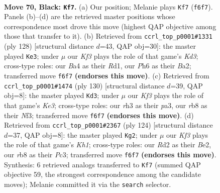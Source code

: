 \documentclass[11pt]{article}
\begin{document}
\clearpage

\begin{figure}[p]\centering
\begin{subfigure}{0.46\textwidth}\centering
\resizebox{\linewidth}{!}{%
\newchessgame
\chessboard[
  setfen={1R4n1/p7/P4k1p/1P3p2/b4P2/7R/3r4/4b1K1 b - - 10 70},
  showmover=false,
  pgfstyle=straightmove, color=movearrow, markmove={f6-f7}
]}
\caption{}
\end{subfigure}\hfill
\begin{subfigure}{0.46\textwidth}\centering
\resizebox{\linewidth}{!}{%
\newchessgame
\chessboard[
  setfen={4k3/7p/2r2BpP/6P1/1r6/3K4/B2p4/3R4 w - - 7 65},
  showmover=false,
  pgfstyle=straightmove, color=movearrow, markmove={d3-e3}
]}
\caption{}
\end{subfigure}
\\[4pt]
\begin{subfigure}{0.46\textwidth}\centering
\resizebox{\linewidth}{!}{%
\newchessgame
\chessboard[
  setfen={4k3/6p1/6r1/1p2P1Bp/1P6/p3KN2/P7/8 w - - 3 66},
  showmover=false,
  pgfstyle=straightmove, color=movearrow, markmove={e3-d3}
]}
\caption{}
\end{subfigure}\hfill
\begin{subfigure}{0.46\textwidth}\centering
\resizebox{\linewidth}{!}{%
\newchessgame
\chessboard[
  setfen={8/8/8/2rNp1k1/P3P3/2P3p1/4B2p/7K w - - 17 63},
  showmover=false,
  pgfstyle=straightmove, color=movearrow, markmove={h1-g2}
]}
\caption{}
\end{subfigure}
\caption{\textbf{Move 70, Black: \texttt{Kf7}.} (a) Our position; Melanie plays \texttt{Kf7} (\texttt{f6f7}). Panels (b)--(d) are the retrieved master positions whose correspondence most drove this move (highest QAP objective among those that transfer to it). (b) Retrieved from \texttt{ccrl\_top\_p0001\#1331} (ply 128) [structural distance $d$=43, QAP obj=30]: the master played \texttt{Ke3}; under $\mu$ our \emph{Kf3} plays the role of that game's \emph{Kd3}; cross-type roles: our \emph{B}a4 as their \emph{R}d1, our \emph{P}h6 as their \emph{B}a2; transferred move \texttt{f6f7} \textbf{(endorses this move)}. (c) Retrieved from \texttt{ccrl\_top\_p0001\#1474} (ply 130) [structural distance $d$=39, QAP obj=8]: the master played \texttt{Kd3}; under $\mu$ our \emph{Kf3} plays the role of that game's \emph{Ke3}; cross-type roles: our \emph{r}h3 as their \emph{p}a3, our \emph{r}b8 as their \emph{N}f3; transferred move \texttt{f6f7} \textbf{(endorses this move)}. (d) Retrieved from \texttt{ccrl\_top\_p0001\#2367} (ply 124) [structural distance $d$=37, QAP obj=8]: the master played \texttt{Kg2}; under $\mu$ our \emph{Kf3} plays the role of that game's \emph{Kh1}; cross-type roles: our \emph{R}d2 as their \emph{B}e2, our \emph{r}b8 as their \emph{P}c3; transferred move \texttt{f6f7} \textbf{(endorses this move)}. Synthesis: 6 retrieved analogs transferred to \texttt{Kf7} (summed QAP objective 59, the strongest correspondence among the candidate moves); Melanie committed it via the \texttt{search} selector.}
\label{fig:thought-m139}
\end{figure}
\end{document}
